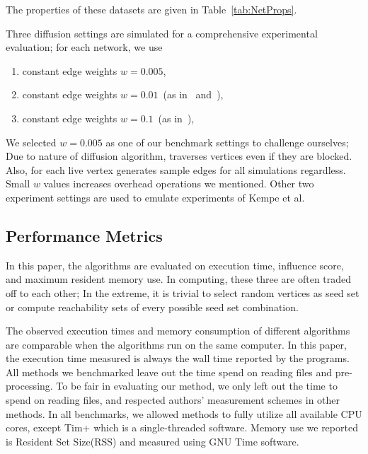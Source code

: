 \documentclass[10pt,journal,compsoc]{IEEEtran}
\newcommand\acro{{\sc{HyperFuseR\xspace}\xspace}\xspace}
\begin{document}
The properties of these datasets are given in Table~\ref{tab:NetProps}. 

Three diffusion settings are simulated for a comprehensive experimental evaluation; for each network, we use 
\begin{enumerate}
    \item constant edge weights $w = 0.005$,
    \item constant edge weights $w = 0.01$~(as in~\cite{kempe2003maximizing} and~\cite{MixGreedy}),
    \item constant edge weights $w = 0.1$~(as in~\cite{kempe2003maximizing}),
\end{enumerate}

We selected $w=0.005$ as one of our benchmark settings to challenge ourselves; Due to nature of diffusion algorithm, \acro traverses vertices even if they are blocked. Also, for each live vertex \acro generates sample edges for all simulations regardless. Small $w$ values increases overhead operations we mentioned. Other two experiment settings are used to emulate experiments of Kempe et al.~\cite{kempe2003maximizing}


\subsection{Performance Metrics}


In this paper, the algorithms are evaluated on execution time, influence score, and maximum resident memory use. In computing, these three are
often traded off to each other; In the extreme, it is trivial to select random vertices as seed set or compute reachability sets of every possible seed set combination. 

The observed execution times and memory consumption of different algorithms are comparable when the algorithms run on the same computer.
In this paper, the execution time measured is always the wall time reported by the programs. 
All methods we benchmarked leave out the time spend on reading files and pre-processing. To be fair in evaluating our method, we only left out the time to spend on reading files, and respected authors' measurement schemes in other methods. 
In all benchmarks, we allowed methods to fully utilize all available CPU cores, except {\sc Tim+} which is a single-threaded software. Memory use we reported is Resident Set Size(RSS) and measured using GNU Time software.
\end{document}
